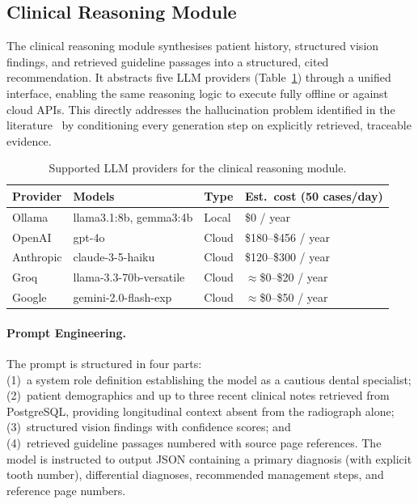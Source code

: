 \documentclass[12pt,a4paper]{report}
\begin{document}
	\subsection{Clinical Reasoning Module}
	\label{sec:reasoning}
	
	The clinical reasoning module synthesises patient history, structured vision findings, and
	retrieved guideline passages into a structured, cited recommendation. It abstracts five LLM
	providers (Table~\ref{tab:llm_providers}) through a unified interface, enabling the same
	reasoning logic to execute fully offline or against cloud APIs. This directly addresses the
	hallucination problem identified in the
	literature~\cite{ji2023survey, Wada2025RAGRadiology} by conditioning every generation step
	on explicitly retrieved, traceable evidence.
	
	\begin{table}[H]
		\centering
		\caption{Supported LLM providers for the clinical reasoning module.}
		\label{tab:llm_providers}
		{\small
			\begin{tabular}{p{2.0cm}p{4.0cm}p{1.8cm}p{3.8cm}}
				\toprule
				\textbf{Provider} & \textbf{Models} & \textbf{Type} & \textbf{Est.\ cost (50 cases/day)} \\
				\midrule
				Ollama    & llama3.1:8b, gemma3:4b         & Local  & \$0 / year \\
				OpenAI    & gpt-4o                         & Cloud  & \$180--\$456 / year \\
				Anthropic & claude-3-5-haiku              & Cloud  & \$120--\$300 / year \\
				Groq      & llama-3.3-70b-versatile        & Cloud  & $\approx$\$0--\$20 / year \\
				Google    & gemini-2.0-flash-exp           & Cloud  & $\approx$\$0--\$50 / year \\
				\bottomrule
			\end{tabular}
		}
	\end{table}
	
	
	\paragraph{Prompt Engineering.}
	The prompt is structured in four parts:\\ (1)~a system role definition establishing the model
	as a cautious dental specialist; \\(2)~patient demographics and up to three recent clinical
	notes retrieved from PostgreSQL, providing longitudinal context absent from the radiograph
	alone; \\
	(3)~structured vision findings with confidence scores; and \\
	(4)~retrieved guideline
	passages numbered with source page references. The model is instructed to output JSON
	containing a primary diagnosis (with explicit tooth number), differential diagnoses,
	recommended management steps, and reference page numbers.
	
\end{document}
